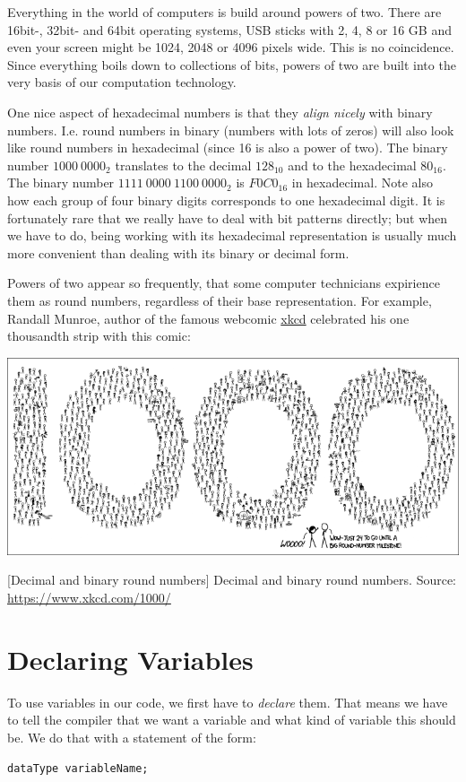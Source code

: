 \begin{plusbox}
Everything in the world of computers is build around powers of two. There are 16bit-, 32bit- and 64bit operating systems, USB sticks with 2, 4, 8 or 16 GB and even your screen might be 1024, 2048 or 4096 pixels wide. This is no coincidence. Since everything boils down to collections of bits, powers of two are built into the very basis of our computation technology.

One nice aspect of hexadecimal numbers is that they \emph{align nicely} with binary numbers. I.\;e. round numbers in binary (numbers with lots of zeros) will also look like round numbers in hexadecimal (since 16 is also a power of two). The binary number $1000~ 0000_2$ translates to the decimal $128_{10}$ and to the hexadecimal $80_{16}$. The binary number $1111~ 0000~ 1100~ 0000_2$ is $F0C0_{16}$ in hexadecimal. Note also how each group of four binary digits corresponds to one hexadecimal digit. It is fortunately rare that we really have to deal with bit patterns directly; but when we have to do, being working with its hexadecimal representation is usually much more convenient than dealing with its binary or decimal form.

Powers of two appear so frequently, that some computer technicians expirience them as round numbers, regardless of their base representation. For example, Randall Munroe, author of the famous webcomic \href{https://www.xkcd.com/}{xkcd} celebrated his one thousandth strip with this comic:
\begin{center}
\includegraphics[width=.9\linewidth]{./gfx/xkcd-1000}
\end{center}
	[Decimal and binary round numbers]
	{Decimal and binary round numbers. Source: \url{https://www.xkcd.com/1000/}}
\end{plusbox}


\section{Declaring Variables} \label{sec:DeclareVars}
To use variables in our code, we first have to \emph{declare} them. That means we have to tell the compiler that we want a variable and what kind of variable this should be. We do that with a statement of the form:
\begin{codebox}
\texttt{dataType variableName;}
\end{codebox}

